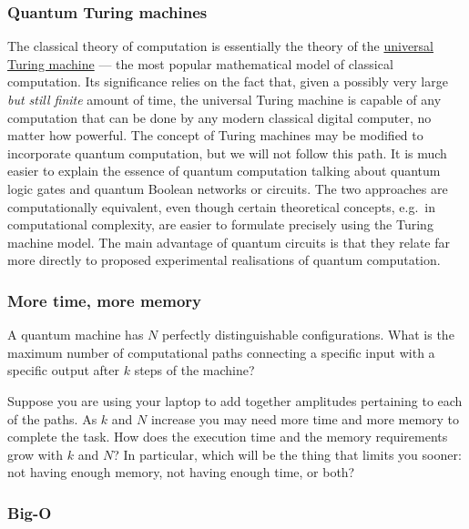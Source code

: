 \documentclass[fleqn]{article}
\begin{document}
\hypertarget{quantum-turing-machines}{%
\subsubsection{Quantum Turing machines}\label{quantum-turing-machines}}

The classical theory of computation is essentially the theory of the \href{https://en.wikipedia.org/wiki/Universal_Turing_machine}{universal Turing machine} --- the most popular mathematical model of classical computation.
Its significance relies on the fact that, given a possibly very large \emph{but still finite} amount of time, the universal Turing machine is capable of any computation that can be done by any modern classical digital computer, no matter how powerful.
The concept of Turing machines may be modified to incorporate quantum computation, but we will not follow this path.
It is much easier to explain the essence of quantum computation talking about quantum logic gates and quantum Boolean networks or circuits.
The two approaches are computationally equivalent, even though certain theoretical concepts, e.g.~in computational complexity, are easier to formulate precisely using the Turing machine model.
The main advantage of quantum circuits is that they relate far more directly to proposed experimental realisations of quantum computation.

\hypertarget{more-time-more-memory}{%
\subsubsection{More time, more memory}\label{more-time-more-memory}}

A quantum machine has \(N\) perfectly distinguishable configurations.
What is the maximum number of computational paths connecting a specific input with a specific output after \(k\) steps of the machine?

Suppose you are using your laptop to add together amplitudes pertaining to each of the paths.
As \(k\) and \(N\) increase you may need more time and more memory to complete the task.
How does the execution time and the memory requirements grow with \(k\) and \(N\)?
In particular, which will be the thing that limits you sooner: not having enough memory, not having enough time, or both?

\hypertarget{big-o}{%
\subsubsection{Big-O}\label{big-o}}
\end{document}
